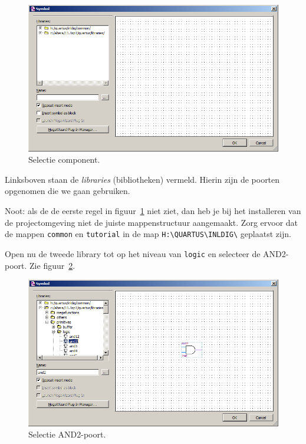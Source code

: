\documentclass[a4paper,12pt,fleqn,twoside]{book}
\def\tutpicscale{0.455}
\newcommand{\naam}[1]{\texttt{#1}}
\begin{document}
\begin{figure}[H]
\centering
\includegraphics[scale=\tutpicscale]{022symbolselection}
\caption{Selectie component.}
\label{fig:022symbolselection}
\end{figure}

Linksboven staan de \textsl{libraries} (bibliotheken) vermeld. Hierin zijn de
poorten opgenomen die we gaan gebruiken.

Noot: als de de eerste regel in figuur~\ref{fig:022symbolselection} niet
ziet, dan heb je bij het installeren van de projectomgeving niet de
juiste mappenstructuur aangemaakt. Zorg ervoor dat de mappen \naam{common}
en \naam{tutorial} in de map \lstinline|H:\QUARTUS\INLDIG\| geplaatst zijn.

Open nu de tweede library tot op het niveau van \naam{logic} en selecteer
de AND2-poort. Zie figuur~\ref{fig:023withandport}.

\begin{figure}[H]
\centering
\includegraphics[scale=\tutpicscale]{023withandport}
\caption{Selectie AND2-poort.}
\label{fig:023withandport}
\end{figure}
\end{document}
